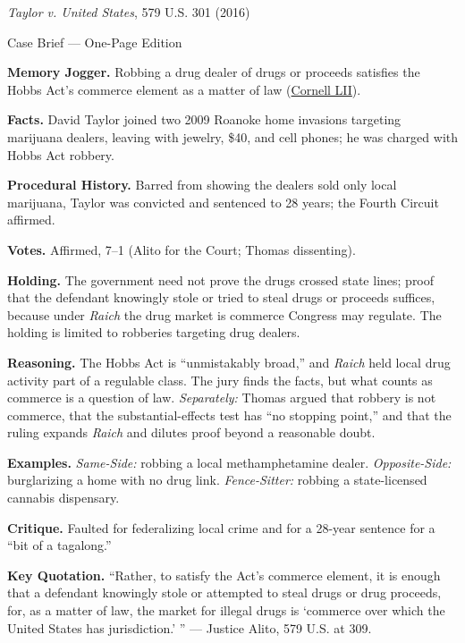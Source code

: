 \documentclass[12pt]{article}
\begin{document}
\begin{center}
{\Large \textit{Taylor v. United States}, 579 U.S. 301 (2016)\par}
\vspace{0.3em}
{\normalsize Case Brief --- One-Page Edition\par}
\end{center}

\textbf{Memory Jogger.} Robbing a drug dealer of drugs or proceeds satisfies the Hobbs Act's commerce element as a matter of law (\href{https://www.law.cornell.edu/supremecourt/text/14-6166}{Cornell LII}).

\textbf{Facts.} David Taylor joined two 2009 Roanoke home invasions targeting marijuana dealers, leaving with jewelry, \$40, and cell phones; he was charged with Hobbs Act robbery.

\textbf{Procedural History.} Barred from showing the dealers sold only local marijuana, Taylor was convicted and sentenced to 28 years; the Fourth Circuit affirmed.

\textbf{Votes.} Affirmed, 7--1 (Alito for the Court; Thomas dissenting).

\textbf{Holding.} The government need not prove the drugs crossed state lines; proof that the defendant knowingly stole or tried to steal drugs or proceeds suffices, because under \textit{Raich} the drug market is commerce Congress may regulate. The holding is limited to robberies targeting drug dealers.

\textbf{Reasoning.} The Hobbs Act is ``unmistakably broad,'' and \textit{Raich} held local drug activity part of a regulable class. The jury finds the facts, but what counts as commerce is a question of law. \emph{Separately:} Thomas argued that robbery is not commerce, that the substantial-effects test has ``no stopping point,'' and that the ruling expands \textit{Raich} and dilutes proof beyond a reasonable doubt.

\textbf{Examples.} \emph{Same-Side:} robbing a local methamphetamine dealer. \emph{Opposite-Side:} burglarizing a home with no drug link. \emph{Fence-Sitter:} robbing a state-licensed cannabis dispensary.

\textbf{Critique.} Faulted for federalizing local crime and for a 28-year sentence for a ``bit of a tagalong.''

\textbf{Key Quotation.} ``Rather, to satisfy the Act's commerce element, it is enough that a defendant knowingly stole or attempted to steal drugs or drug proceeds, for, as a matter of law, the market for illegal drugs is `commerce over which the United States has jurisdiction.' '' --- Justice Alito, 579 U.S. at 309.
\end{document}
